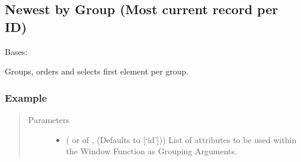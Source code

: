 \documentclass[a4paper,10pt, twoside,english]{sphinxmanual}
\begin{document}
\subsection{Newest by Group (Most current record per ID)}
\label{\detokenize{transformer/newest_by_group:module-spooq2.transformer.newest_by_group}}\label{\detokenize{transformer/newest_by_group:newest-by-group-most-current-record-per-id}}\label{\detokenize{transformer/newest_by_group::doc}}

\begin{fulllineitems}
\label{\detokenize{transformer/newest_by_group:spooq2.transformer.newest_by_group.NewestByGroup}}
Bases: {\hyperref[\detokenize{base_classes/transformer:spooq2.transformer.transformer.Transformer}]{}}

Groups, orders and selects first element per group.
\subsubsection*{Example}

\begin{sphinxVerbatim}[commandchars=\\\{\}]
  
    \PYG{p}{[} \PYG{p}{]}
    \PYG{p}{[} \PYG{p}{]}
\end{sphinxVerbatim}
\begin{quote}\begin{description}
\item[{Parameters}] \leavevmode\begin{itemize}
\item {} 
 ( or  of , (Defaults to {[}‘id’{]})) \textendash{} List of attributes to be used within the Window Function as Grouping Arguments.


\end{itemize}
\end{description}
\end{quote}
\end{fulllineitems}
\end{document}
